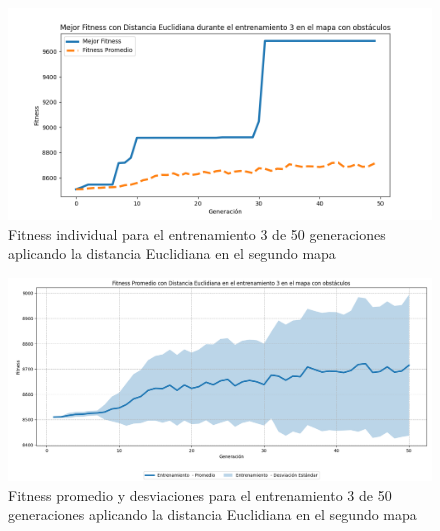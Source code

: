\documentclass[conference]{IEEEtran}
\begin{document}
\begin{figure}[H]
    \centering
    \includegraphics[width=0.9 \linewidth]{Euclidiana/Mapa2/Fitness_3_Map2_Eucli_50Gen.png}
    \caption{Fitness individual para el entrenamiento 3 de 50 generaciones aplicando la distancia Euclidiana en el segundo mapa}
    \label{fig:eucli_3_50_m2}
\end{figure}
\begin{figure}[H]
    \centering
    \includegraphics[width=0.9 \linewidth]{Euclidiana/Mapa2/Fitness_3_Map2_Eucli_50Gen_Sombra.png}
    \caption{Fitness promedio y desviaciones para el entrenamiento 3 de 50 generaciones aplicando la distancia Euclidiana en el segundo mapa}
    \label{fig:eucli_3_50_sombra_m2}
\end{figure}
\end{document}
